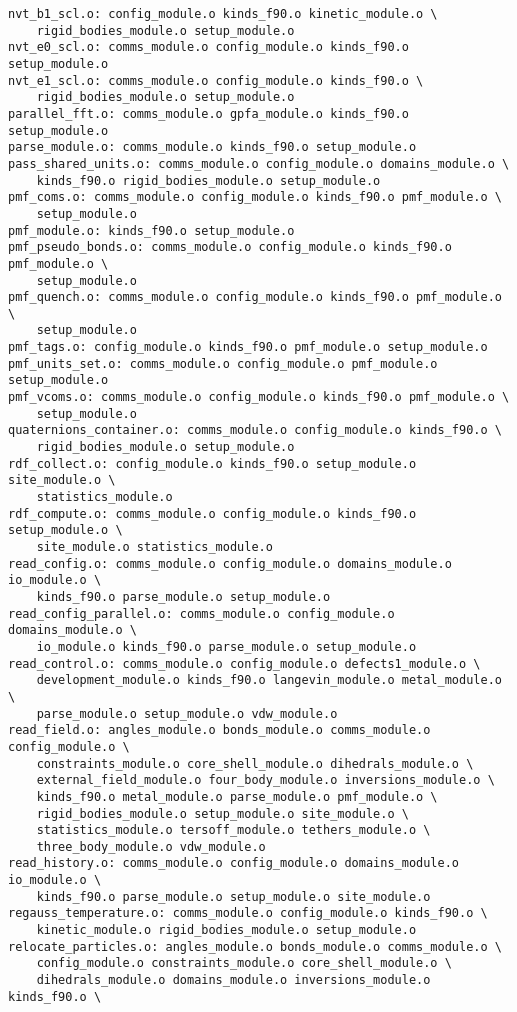 \begin{verbatim}
nvt_b1_scl.o: config_module.o kinds_f90.o kinetic_module.o \
	rigid_bodies_module.o setup_module.o
nvt_e0_scl.o: comms_module.o config_module.o kinds_f90.o setup_module.o
nvt_e1_scl.o: comms_module.o config_module.o kinds_f90.o \
	rigid_bodies_module.o setup_module.o
parallel_fft.o: comms_module.o gpfa_module.o kinds_f90.o setup_module.o
parse_module.o: comms_module.o kinds_f90.o setup_module.o
pass_shared_units.o: comms_module.o config_module.o domains_module.o \
	kinds_f90.o rigid_bodies_module.o setup_module.o
pmf_coms.o: comms_module.o config_module.o kinds_f90.o pmf_module.o \
	setup_module.o
pmf_module.o: kinds_f90.o setup_module.o
pmf_pseudo_bonds.o: comms_module.o config_module.o kinds_f90.o pmf_module.o \
	setup_module.o
pmf_quench.o: comms_module.o config_module.o kinds_f90.o pmf_module.o \
	setup_module.o
pmf_tags.o: config_module.o kinds_f90.o pmf_module.o setup_module.o
pmf_units_set.o: comms_module.o config_module.o pmf_module.o setup_module.o
pmf_vcoms.o: comms_module.o config_module.o kinds_f90.o pmf_module.o \
	setup_module.o
quaternions_container.o: comms_module.o config_module.o kinds_f90.o \
	rigid_bodies_module.o setup_module.o
rdf_collect.o: config_module.o kinds_f90.o setup_module.o site_module.o \
	statistics_module.o
rdf_compute.o: comms_module.o config_module.o kinds_f90.o setup_module.o \
	site_module.o statistics_module.o
read_config.o: comms_module.o config_module.o domains_module.o io_module.o \
	kinds_f90.o parse_module.o setup_module.o
read_config_parallel.o: comms_module.o config_module.o domains_module.o \
	io_module.o kinds_f90.o parse_module.o setup_module.o
read_control.o: comms_module.o config_module.o defects1_module.o \
	development_module.o kinds_f90.o langevin_module.o metal_module.o \
	parse_module.o setup_module.o vdw_module.o
read_field.o: angles_module.o bonds_module.o comms_module.o config_module.o \
	constraints_module.o core_shell_module.o dihedrals_module.o \
	external_field_module.o four_body_module.o inversions_module.o \
	kinds_f90.o metal_module.o parse_module.o pmf_module.o \
	rigid_bodies_module.o setup_module.o site_module.o \
	statistics_module.o tersoff_module.o tethers_module.o \
	three_body_module.o vdw_module.o
read_history.o: comms_module.o config_module.o domains_module.o io_module.o \
	kinds_f90.o parse_module.o setup_module.o site_module.o
regauss_temperature.o: comms_module.o config_module.o kinds_f90.o \
	kinetic_module.o rigid_bodies_module.o setup_module.o
relocate_particles.o: angles_module.o bonds_module.o comms_module.o \
	config_module.o constraints_module.o core_shell_module.o \
	dihedrals_module.o domains_module.o inversions_module.o kinds_f90.o \

\end{verbatim}
